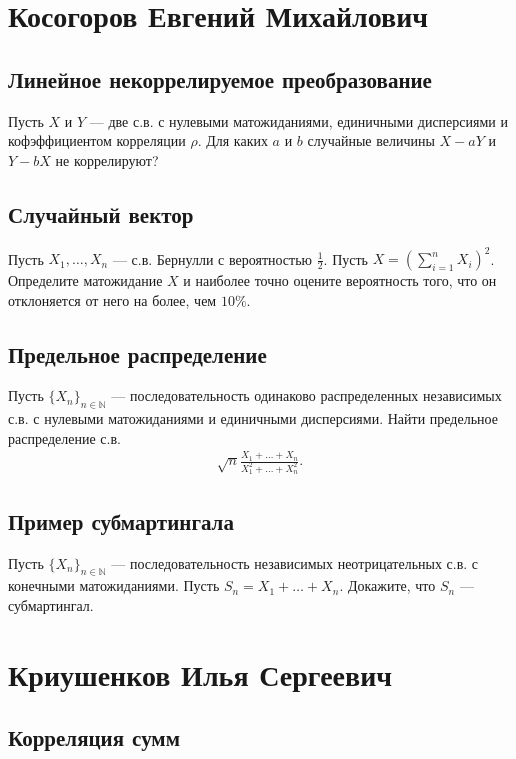 \documentclass[12pt]{article}
\newcommand\N{\mathbb{N}}
\begin{document}
\newpage
\section{Косогоров Евгений Михайлович}

\subsection{Линейное некоррелируемое преобразование}

Пусть $X$ и $Y$ --- две с.в. с нулевыми матожиданиями, единичными дисперсиями и кофэффициентом корреляции $\rho$. Для каких $a$ и $b$ случайные величины $X - aY$ и $Y - bX$ не коррелируют?


\subsection{Случайный вектор}

Пусть $X_1, \dots, X_n$ --- с.в. Бернулли с вероятностью $\frac{1}{2}$. Пусть $X = (\sum_{i = 1}^n X_i)^2$. Определите матожидание $X$ и наиболее точно оцените вероятность того, что он отклоняется от него на более, чем $10\%$.


\subsection{Предельное распределение}

Пусть $\{X_n\}_{n \in \N}$ --- последовательность одинаково распределенных независимых с.в. с нулевыми матожиданиями и единичными дисперсиями. Найти предельное распределение с.в.
\begin{align*}
    \sqrt{n}\frac{X_1 + \dots + X_n}{X_1^2 + \dots + X_n^2}.
\end{align*}

\subsection{Пример субмартингала}

Пусть $\{X_n\}_{n \in \N}$ --- последовательность независимых неотрицательных с.в. с конечными матожиданиями. Пусть $S_n = X_1 + \dots + X_n$. Докажите, что $S_n$ --- субмартингал.

\newpage
\section{Криушенков Илья Сергеевич}

\subsection{Корреляция сумм}
\end{document}
